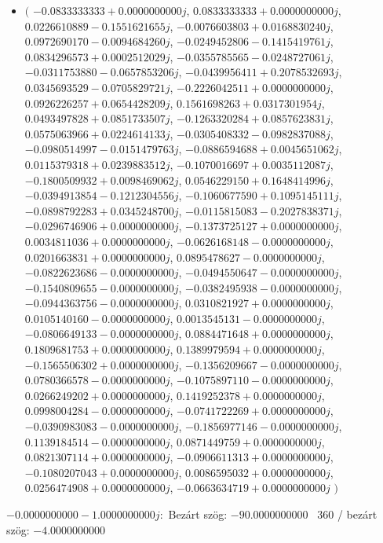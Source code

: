 \documentclass[14pt,a4paper]{article}
\begin{document}
\begin{itemize}
\item
$\big($
$-0.0833333333+0.0000000000j$, $0.0833333333+0.0000000000j$, $0.0226610889-0.1551621655j$, $-0.0076603803+0.0168830240j$, $0.0972690170-0.0094684260j$, $-0.0249452806-0.1415419761j$, $0.0834296573+0.0002512029j$, $-0.0355785565-0.0248727061j$, $-0.0311753880-0.0657853206j$, $-0.0439956411+0.2078532693j$, $0.0345693529-0.0705829721j$, $-0.2226042511+0.0000000000j$, $0.0926226257+0.0654428209j$, $0.1561698263+0.0317301954j$, $0.0493497828+0.0851733507j$, $-0.1263320284+0.0857623831j$, $0.0575063966+0.0224614133j$, $-0.0305408332-0.0982837088j$, $-0.0980514997-0.0151479763j$, $-0.0886594688+0.0045651062j$, $0.0115379318+0.0239883512j$, $-0.1070016697+0.0035112087j$, $-0.1800509932+0.0098469062j$, $0.0546229150+0.1648414996j$, $-0.0394913854-0.1212304556j$, $-0.1060677590+0.1095145111j$, $-0.0898792283+0.0345248700j$, $-0.0115815083-0.2027838371j$, $-0.0296746906+0.0000000000j$, $-0.1373725127+0.0000000000j$, $0.0034811036+0.0000000000j$, $-0.0626168148-0.0000000000j$, $0.0201663831+0.0000000000j$, $0.0895478627-0.0000000000j$, $-0.0822623686-0.0000000000j$, $-0.0494550647-0.0000000000j$, $-0.1540809655-0.0000000000j$, $-0.0382495938-0.0000000000j$, $-0.0944363756-0.0000000000j$, $0.0310821927+0.0000000000j$, $0.0105140160-0.0000000000j$, $0.0013545131-0.0000000000j$, $-0.0806649133-0.0000000000j$, $0.0884471648+0.0000000000j$, $0.1809681753+0.0000000000j$, $0.1389979594+0.0000000000j$, $-0.1565506302+0.0000000000j$, $-0.1356209667-0.0000000000j$, $0.0780366578-0.0000000000j$, $-0.1075897110-0.0000000000j$, $0.0266249202+0.0000000000j$, $0.1419252378+0.0000000000j$, $0.0998004284-0.0000000000j$, $-0.0741722269+0.0000000000j$, $-0.0390983083-0.0000000000j$, $-0.1856977146-0.0000000000j$, $0.1139184514-0.0000000000j$, $0.0871449759+0.0000000000j$, $0.0821307114+0.0000000000j$, $-0.0906611313+0.0000000000j$, $-0.1080207043+0.0000000000j$, $0.0086595032+0.0000000000j$, $0.0256474908+0.0000000000j$, $-0.0663634719+0.0000000000j$
$\big)$
\end{itemize}
$-0.0000000000-1.0000000000j$:\
Bezárt szög: $-90.0000000000$ \
360 / bezárt szög: $-4.0000000000$\
\end{document}
